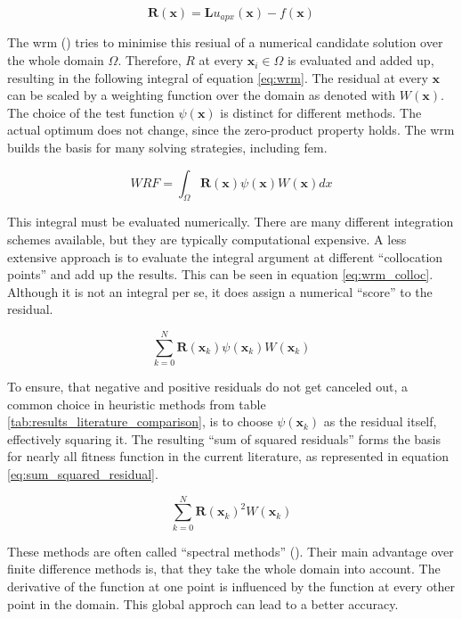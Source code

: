 \documentclass[./\jobname.tex]{subfiles}
\begin{document}
\begin{equation}
\label{eq:residual}
\mathbf{R}(\mathbf{x}) = \mathbf{L}u_{apx}(\mathbf{x}) - f(\mathbf{x})
\end{equation}

The \gls{wrm} (\cite{shen_spectral_2011}) tries to minimise this resiual of a numerical candidate solution over the whole domain $\Omega$. Therefore, $R$ at every $\mathbf{x}_i \in \Omega$ is evaluated and added up, resulting in the following integral of equation \ref{eq:wrm}. The residual at every $\mathbf{x}$ can be scaled by a weighting function over the domain as denoted with $W(\mathbf{x})$. The choice of the test function $\psi(\mathbf{x})$ is distinct for different methods. The actual optimum does not change, since the zero-product property holds. The \gls{wrm} builds the basis for many solving strategies, including \gls{fem}. 

\begin{equation}
\label{eq:wrm}
WRF = \int_{\Omega} \mathbf{R}(\mathbf{x}) \psi(\mathbf{x}) W(\mathbf{x}) dx
\end{equation}

This integral must be evaluated numerically. There are many different integration schemes available, but they are typically computational expensive. A less extensive approach is to evaluate the integral argument at different ``collocation points'' and add up the results. This can be seen in equation \ref{eq:wrm_colloc}. Although it is not an integral per se, it does assign a numerical ``score'' to the residual. 

\begin{equation}
\label{eq:wrm_colloc}
\sum_{k=0}^{N} \mathbf{R}(\mathbf{x}_k) \psi(\mathbf{x}_k) W(\mathbf{x}_k)
\end{equation}

To ensure, that negative and positive residuals do not get canceled out, a common choice in heuristic methods from table \ref{tab:results_literature_comparison}, is to choose $\psi(\mathbf{x}_k)$ as the residual itself, effectively squaring it. The resulting ``sum of squared residuals'' forms the basis for nearly all fitness function in the current literature, as represented in equation \ref{eq:sum_squared_residual}.

\begin{equation}
\label{eq:sum_squared_residual}
\sum_{k=0}^{N} \mathbf{R}(\mathbf{x}_k)^2 W(\mathbf{x}_k)
\end{equation}

These methods are often called ``spectral methods'' (\cite{shen_spectral_2011}). Their main advantage over finite difference methods is, that they take the whole domain into account. The derivative of the function at one point is influenced by the function at every other point in the domain. This global approch can lead to a better accuracy. 
\end{document}
